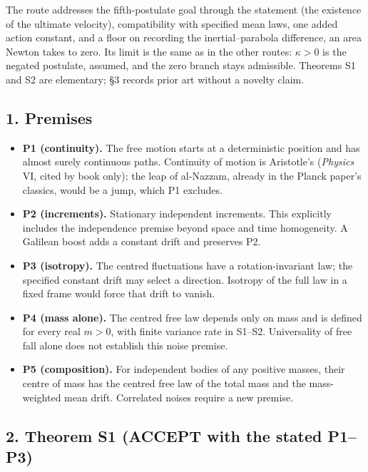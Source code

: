 \documentclass[11pt,a4paper]{article}
\newcommand{\tightlist}{\setlength{\itemsep}{0pt}\setlength{\parskip}{0pt}}
\begin{document}
The route addresses the fifth-postulate goal through the statement (the
existence of the ultimate velocity), compatibility with specified mean
laws, one added action constant, and a floor on recording the
inertial--parabola difference, an area Newton takes to zero. Its limit
is the same as in the other routes: \(\kappa>0\) is the negated
postulate, assumed, and the zero branch stays admissible. Theorems S1
and S2 are elementary; §3 records prior art without a novelty claim.

\hypertarget{premises}{%
\subsection{1. Premises}\label{premises}}

\begin{itemize}
\tightlist
\item
  \textbf{P1 (continuity).} The free motion starts at a deterministic
  position and has almost surely continuous paths. Continuity of motion
  is Aristotle's (\emph{Physics} VI, cited by book only); the leap of
  al-Nazzam, already in the Planck paper's classics, would be a jump,
  which P1 excludes.
\item
  \textbf{P2 (increments).} Stationary independent increments. This
  explicitly includes the independence premise beyond space and time
  homogeneity. A Galilean boost adds a constant drift and preserves P2.
\item
  \textbf{P3 (isotropy).} The centred fluctuations have a
  rotation-invariant law; the specified constant drift may select a
  direction. Isotropy of the full law in a fixed frame would force that
  drift to vanish.
\item
  \textbf{P4 (mass alone).} The centred free law depends only on mass
  and is defined for every real \(m>0\), with finite variance rate in
  S1--S2. Universality of free fall alone does not establish this noise
  premise.
\item
  \textbf{P5 (composition).} For independent bodies of any positive
  masses, their centre of mass has the centred free law of the total
  mass and the mass-weighted mean drift. Correlated noises require a new
  premise.
\end{itemize}

\hypertarget{theorem-s1-accept-with-the-stated-p1p3}{%
\subsection{2. Theorem S1 (ACCEPT with the stated
P1--P3)}\label{theorem-s1-accept-with-the-stated-p1p3}}
\end{document}

